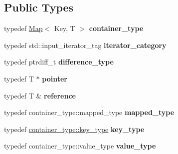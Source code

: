 \subsection*{Public Types}
\begin{DoxyCompactItemize}
\item 
\mbox{\label{classMapIterator_a0e4864213515d9eac874cdfcedca6471}} 
typedef \hyperlink{classMap}{Map}$<$ Key, T $>$ {\bfseries container\+\_\+type}
\item 
\mbox{\label{classMapIterator_af7fd1f23ad34734d4a40a1ff0175c2b8}} 
typedef std\+::input\+\_\+iterator\+\_\+tag {\bfseries iterator\+\_\+category}
\item 
\mbox{\label{classMapIterator_a64f514ba6181c3210b2712848d1e4659}} 
typedef ptrdiff\+\_\+t {\bfseries difference\+\_\+type}
\item 
\mbox{\label{classMapIterator_af9d26e048bb4713c0d748d06c000a84d}} 
typedef T $\ast$ {\bfseries pointer}
\item 
\mbox{\label{classMapIterator_a45e98fa2e2cccd8f228a8367d5615f51}} 
typedef T \& {\bfseries reference}
\item 
\mbox{\label{classMapIterator_a14cdbf4a06035dee846e299ba371b6b2}} 
typedef container\+\_\+type\+::mapped\+\_\+type {\bfseries mapped\+\_\+type}
\item 
\mbox{\label{classMapIterator_a1994b9d365b07113c9ab428dd8d99d08}} 
typedef \hyperlink{classMap_a430e42d1c6a02e95eb3a34626e313441}{container\+\_\+type\+::key\+\_\+type} {\bfseries key\+\_\+type}
\item 
\mbox{\label{classMapIterator_aa8c36b9be77994e93a7988f1f0c4edf8}} 
typedef container\+\_\+type\+::value\+\_\+type {\bfseries value\+\_\+type}
\end{DoxyCompactItemize}
